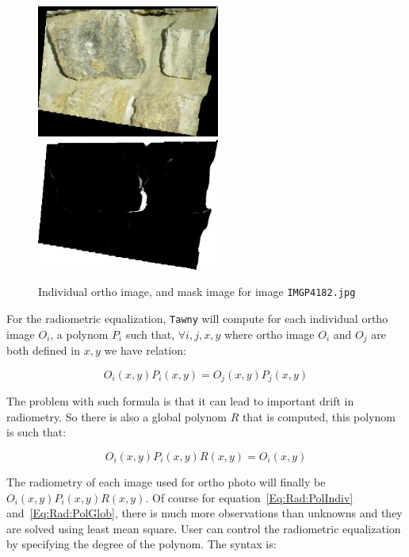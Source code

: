 \begin{figure}
\begin{center}
\includegraphics[width=60mm]{FIGS/MurSaintMartin/Ort_IMGP4182.jpg}
\includegraphics[width=60mm]{FIGS/MurSaintMartin/PC_IMGP4182.jpg}
\end{center}
\caption{Individual ortho image, and mask image for image {\tt IMGP4182.jpg}}
\label{FIG:Malt:Input}
\end{figure}




For the radiometric equalization, {\tt Tawny}  will compute for each
individual ortho image $O_i$, a polynom $P_i$ such that, $\forall i,j,x,y$
where ortho image $O_i$ and $O_j$ are both defined in $x,y$ we have relation:

\begin{equation}
   O_i(x,y) P_i(x,y) = O_j(x,y) P_j(x,y)
\label{Eq:Rad:PolIndiv}
\end{equation}


The problem with such formula is that it can lead to important drift in radiometry.
So there is also a global polynom $R$ that is computed, this polynom is such that:

\begin{equation}
   O_i(x,y) P_i(x,y) R(x,y) =  O_i(x,y)
\label{Eq:Rad:PolGlob}
\end{equation}

The radiometry of each image used for ortho photo will finally be $O_i(x,y) P_i(x,y) R(x,y)$.
Of course for equation~\ref{Eq:Rad:PolIndiv} and~\ref{Eq:Rad:PolGlob}, there is
much more observations than unknowns and they are solved using least mean square.
User can control the radiometric equalization by specifying the
degree of the polynom. The syntax is:




